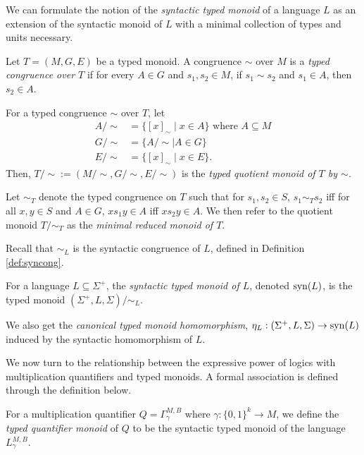 \documentclass[a4paper,UKenglish,cleveref, autoref, thm-restate, anonymous]{lipics-v2021}
\begin{document}
We can formulate the notion of the \emph{syntactic typed monoid} of a language $L$ as an extension of the syntactic monoid of $L$ with a minimal collection of types and units necessary.
\begin{definition}\label{def:typedcongmin}
    Let $T = (M, G, E)$ be a typed monoid. A congruence $\sim$ over $M$ is a \emph{typed congruence over $T$} if for every $A \in G$ and $s_1,s_2\in M$, if $s_1 \sim s_2$ and $s_1 \in A$, then $s_2 \in A$.

    For a typed congruence $\sim$ over $T$, let
    \begin{align*}
        A/{\sim} &= \{[x]_\sim \mid x \in A\} \text{ where $A \subseteq M$}\\
        G/{\sim} &= \{A/{\sim} \mid A \in G\}\\
        E/{\sim} &= \{[x]_\sim \mid x \in E\}.
    \end{align*}
    \noindent Then, $T/{\sim} := (M/{\sim}, G/{\sim}, E/{\sim})$ is the \emph{typed quotient monoid of $T$ by $\sim$}.

    Let $\sim_T$ denote the typed congruence on $T$ such that for $s_1,s_2 \in S$, $s_1 \sim_T s_2$ iff for all $x,y \in S$ and $A \in G$, $xs_1y \in A$ iff $xs_2y \in A$. We then refer to the quotient monoid $T/{\sim_T}$ as the \emph{minimal reduced monoid of $T$}.
\end{definition}

Recall that ${\sim_L}$ is the syntactic congruence of $L$, defined in Definition \ref{def:syncong}.
\begin{definition}
    For a language $L \subseteq \Sigma^+$, the \emph{syntactic typed monoid of $L$}, denoted $\mathrm{syn}(L)$, is the typed monoid $(\Sigma^+, L, \Sigma)/{\sim_L}$. 
\end{definition} 
    We also get the \emph{canonical typed monoid homomorphism}, $\eta_L : (\Sigma^+, L, \Sigma) \rightarrow \mathrm{syn}(L)$ induced by the syntactic homomorphism of $L$.


We now turn to the relationship between the expressive power of logics with multiplication quantifiers and typed monoids.  A formal association is defined through the definition below.

\begin{definition}\label{def:origtypedquantsemi}
    For a multiplication quantifier $Q=\Gamma^{M,B}_{\gamma}$ where $\gamma : \{0,1\}^k \rightarrow M$, we define the \emph{typed quantifier monoid} of $Q$ to be the syntactic typed monoid of the language $L^{M,B}_{\gamma}$.  
\end{definition}
\end{document}
